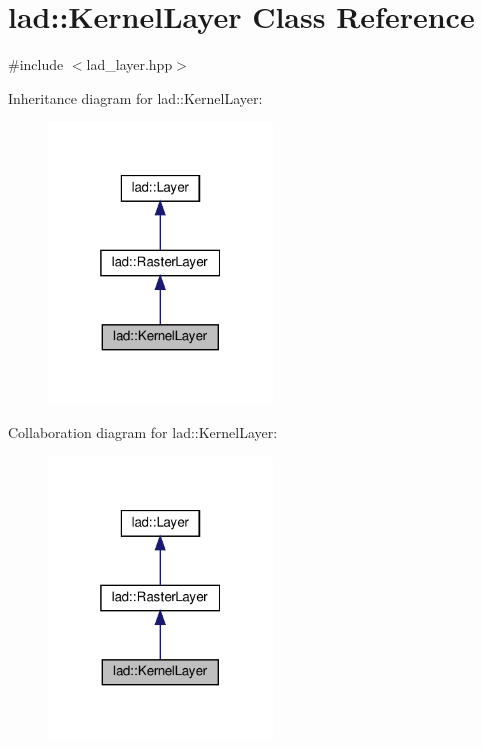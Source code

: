 \hypertarget{classlad_1_1_kernel_layer}{}\section{lad\+:\+:Kernel\+Layer Class Reference}
\label{classlad_1_1_kernel_layer}


{\ttfamily \#include $<$lad\+\_\+layer.\+hpp$>$}



Inheritance diagram for lad\+:\+:Kernel\+Layer\+:\nopagebreak
\begin{figure}[H]
\begin{center}
\leavevmode
\includegraphics[width=169pt]{classlad_1_1_kernel_layer__inherit__graph}
\end{center}
\end{figure}


Collaboration diagram for lad\+:\+:Kernel\+Layer\+:\nopagebreak
\begin{figure}[H]
\begin{center}
\leavevmode
\includegraphics[width=169pt]{classlad_1_1_kernel_layer__coll__graph}
\end{center}
\end{figure}
